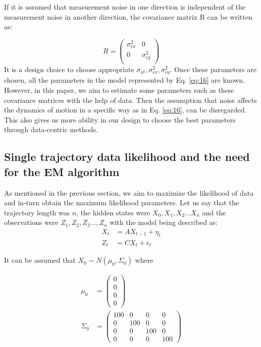 \documentclass{article}
\begin{document}
If it is assumed that measurement noise in one direction is independent of the measurement noise in another direction, the covariance matrix R can be written as:

\begin{equation}\label{eq:19}
    R=\begin{pmatrix}
    \sigma_{\epsilon x}^2 & 0\\
     0 & \sigma_{\epsilon y}^2\\
    \end{pmatrix}
\end{equation}
It is a design choice to choose appropriate $\sigma_{\eta^2}, \sigma_{\epsilon x}^2, \sigma_{\epsilon y}^2$. Once these parameters are chosen, all the parameters in the model represented by Eq. \ref{eq:16} are known. However, in this paper, we aim to estimate some parameters such as these covariance matrices with the help of data. Then the assumption that noise affects the dynamics of motion in a specific way as in Eq. \ref{eq:16}, can be disregarded. This also gives us more ability in our design to choose the best parameters through data-centric methods. 

\subsection{Single trajectory data likelihood and the need for the EM algorithm}
As mentioned in the previous section, we aim to maximize the likelihood of data and in-turn obtain the maximum likelihood parameters. Let us say that the trajectory length was $n$, the hidden states were ${X_0,X_1,X_2...X_n}$ and the observations were ${Z_1,Z_2,Z_3...,Z_n}$ with the model being described as:
\begin{equation} \label{eq:20}
\begin{split}
      X_{t}&=AX_{t-1} + \eta_t \\ 
      Z_{t}&=CX_{t}+\epsilon_t  
\end{split}
\end{equation}

It can be assumed that $X_0 \sim N(\mu_0,\Sigma_0)$ where  

\begin{equation}\label{eq:init1}
\begin{split}
    \mu_0 &= \begin{pmatrix}
    0\\
     0 \\
     0\\
     0
     \end{pmatrix}\\
     \Sigma_0 &= \begin{pmatrix}
    100 & 0 & 0 & 0\\
     0 & 100 & 0 & 0 \\
     0 & 0 & 100 & 0\\
     0 & 0 & 0 & 100
    \end{pmatrix}
\end{split}
\end{equation}
\end{document}
